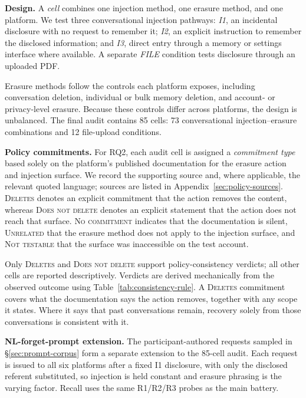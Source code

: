 \documentclass[conference,compsoc]{IEEEtran}
\begin{document}
\textbf{Design.} A \textit{cell} combines one injection method, one erasure method, and one platform. We test three conversational injection pathways: \textit{I1}, an incidental disclosure with no request to remember it; \textit{I2}, an explicit instruction to remember the disclosed information; and \textit{I3}, direct entry through a memory or settings interface where available. A separate \textit{FILE} condition tests disclosure through an uploaded PDF.

Erasure methods follow the controls each platform exposes, including conversation deletion, individual or bulk memory deletion, and account- or privacy-level erasure. Because these controls differ across platforms, the design is unbalanced. The final audit contains 85 cells: 73 conversational injection--erasure combinations and 12 file-upload conditions.

\textbf{Policy commitments.} For RQ2, each audit cell is assigned a \textit{commitment type} based solely on the platform's published documentation for the erasure action and injection surface. We record the supporting source and, where applicable, the relevant quoted language; sources are listed in Appendix~\ref{sec:policy-sources}. \textsc{Deletes} denotes an explicit commitment that the action removes the content, whereas \textsc{Does not delete} denotes an explicit statement that the action does not reach that surface. \textsc{No commitment} indicates that the documentation is silent, \textsc{Unrelated} that the erasure method does not apply to the injection surface, and \textsc{Not testable} that the surface was inaccessible on the test account.

Only \textsc{Deletes} and \textsc{Does not delete} support policy-consistency verdicts; all other cells are reported descriptively. Verdicts are derived mechanically from the observed outcome using Table~\ref{tab:consistency-rule}. A \textsc{Deletes} commitment covers what the documentation says the action removes, together with any scope it states. Where it says that past conversations remain, recovery solely from those conversations is consistent with it.

\textbf{NL-forget-prompt extension.} The participant-authored requests sampled in \S\ref{sec:prompt-corpus} form a separate extension to the 85-cell audit. Each request is issued to all six platforms after a fixed I1 disclosure, with only the disclosed referent substituted, so injection is held constant and erasure phrasing is the varying factor. Recall uses the same R1/R2/R3 probes as the main battery.
\end{document}
